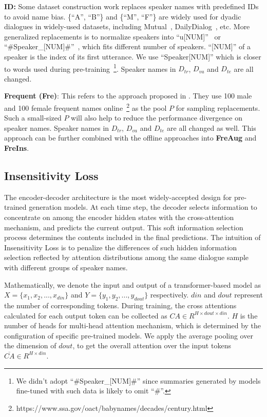 \textbf{ID:} Some dataset construction work replaces speaker names with predefined IDs to avoid name bias. \{``A'', ``B''\} and \{``M'', ``F''\} are widely used for dyadic dialogues in widely-used datasets, including Mutual~\cite{cui2020mutual}, DailyDialog~\cite{li2017dailydialog}, etc. More generalized replacements is to 
normalize speakers into ``u[NUM]''~\cite{kim2019eighth} or ``\#Speaker\_[NUM]\#''~\cite{chen2021dialogsum}, which fits different number of speakers. ``[NUM]'' of a speaker is the index of its first utterance. We use ``Speaker[NUM]'' which is closer to words used during pre-training~\footnote{We didn't adopt ``\#Speaker\_[NUM]\#'' since summaries generated by models fine-tuned with such data is likely to omit ``\#''. }. Speaker names in $D_{tr}$, $D_{va}$ and $D_{te}$ are all changed.

\textbf{Frequent (Fre)}: This refers to the approach proposed in \citet{khalifa2021bag}. They use 100 male and 100 female frequent names online~\footnote{https://www.ssa.gov/oact/babynames/decades/century.html} as the pool $P$ for sampling replacements. Such a small-sized $P$ will also help to reduce the performance divergence on speaker names. Speaker names in $D_{tr}$, $D_{va}$ and $D_{te}$ are all changed as well. This approach can be further combined with the offline approaches into \textbf{FreAug} and \textbf{FreIns}.






\subsection{Insensitivity Loss}
\label{sec:insloss}

The encoder-decoder architecture is the most widely-accepted design for pre-trained generation models. At each time step, the decoder selects information to concentrate on among the encoder hidden states with the cross-attention mechanism, and predicts the current output. This soft information selection process determines the contents included in the final predictions. The intuition of Insensitivity Loss is to penalize the differences of such hidden information selection reflected by attention distributions among the same dialogue sample with different groups of speaker names. 



Mathematically, we denote the input and output of a transformer-based model as $X=\{x_1, x_2, ..., x_{din} \}$ and $Y=\{y_1, y_2, ..., y_{dout}\}$ respectively. $din$ and $dout$ represent the number of corresponding tokens.
During training, the cross attentions calculated for each output token can be collected as $CA\in R^{H\times dout \times din}$. $H$ is the number of heads for multi-head attention mechanism, which is determined by the configuration of specific pre-trained models. We apply the average pooling over the dimension of $dout$, to get the overall attention over the input tokens $\overline{CA}\in R^{H\times din}$.


